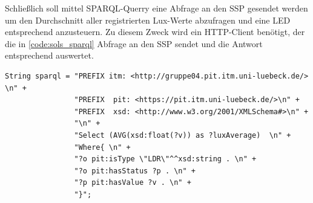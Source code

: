 Schließlich soll mittel SPARQL-Querry eine Abfrage an den SSP gesendet werden um den Durchschnitt aller registrierten Lux-Werte abzufragen und eine LED entsprechend anzusteuern. Zu diesem Zweck wird ein HTTP-Client benötigt, der die in \ref{code:sols_sparql} Abfrage an den SSP sendet und die Antwort entsprechend auswertet.

\begin{lstlisting}[float=htb,caption={SPARQL-Query zur Ermittlung des durchschnittlichen Lux-Wertes},label=code:sols_sparql]
String sparql = "PREFIX itm: <http://gruppe04.pit.itm.uni-luebeck.de/> \n" +
				"PREFIX  pit: <https://pit.itm.uni-luebeck.de/>\n" +
				"PREFIX  xsd: <http://www.w3.org/2001/XMLSchema#>\n" +
				"\n" + 
				"Select (AVG(xsd:float(?v)) as ?luxAverage)  \n" + 
				"Where{ \n" +
				"?o pit:isType \"LDR\"^^xsd:string . \n" +
				"?o pit:hasStatus ?p . \n" +
				"?p pit:hasValue ?v . \n" +
				"}";
\end{lstlisting}







